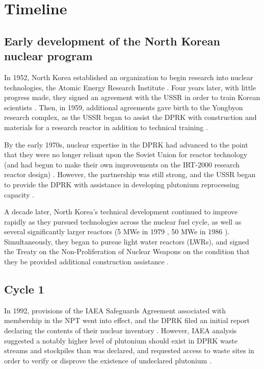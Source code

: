 \section{Timeline}
\subsection{Early development of the North Korean nuclear program}
In 1952, North Korea established an organization to begin research into nuclear technologies, the Atomic Energy Research Institute \cite{ntiAERI}. Four years later, with little progress made, they signed an agreement with the USSR in order to train Korean scientists \cite{nti15}. Then, in 1959, additional agreements gave birth to the Yongbyon research complex, as the USSR began to assist the DPRK with construction and materials for a research reactor in addition to technical training \cite{nti15}.

By the early 1970s, nuclear expertise in the DPRK had advanced to the point that they were no longer reliant upon the Soviet Union for reactor technology (and had begun to make their own improvements on the IRT-2000 research reactor design) \cite{nti15}. However, the partnership was still strong, and the USSR began to provide the DPRK with assistance in developing plutonium reprocessing capacity \cite{nti15}.

A decade later, North Korea's technical development continued to improve rapidly as they pursued technologies across the nuclear fuel cycle, as well as several significantly larger reactors (5 MWe in 1979 \cite{ntiYongbyon}, 50 MWe in 1986 \cite{ntiYongbyon2}). Simultaneously, they began to pursue light water reactors (LWRs), and signed the Treaty on the Non-Proliferation of Nuclear Weapons on the condition that they be provided additional construction assistance \cite{nti15}.   


\subsection{Cycle 1}

In 1992, provisions of the IAEA Safeguards Agreement associated with membership in the NPT went into effect, and the DPRK filed an initial report declaring the contents of their nuclear inventory \cite{iaea92}. However, IAEA analysis suggested a notably higher level of plutonium should exist in DPRK waste streams and stockpiles than was declared, and requested access to waste sites in order to verify or disprove the existence of undeclared plutonium \cite{iaea09}. 

